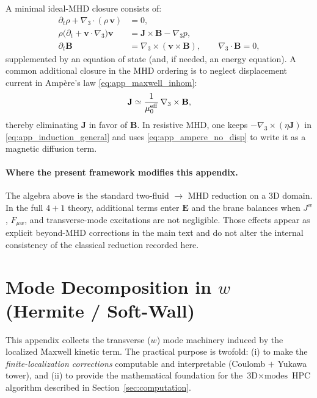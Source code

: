 \documentclass[11pt]{article}
\newcommand{\gradthree}{\nabla_3}
\begin{document}
A minimal ideal-MHD closure consists of:
\begin{align}
\partial_t\rho + \gradthree\cdot(\rho\,\mathbf{v}) &= 0,
\label{eq:app_mhd_cont}
\\
\rho\Big(\partial_t + \mathbf{v}\cdot\gradthree\Big)\mathbf{v}
&= \mathbf{J}\times\mathbf{B} - \gradthree p,
\label{eq:app_mhd_mom}
\\
\partial_t\mathbf{B} &= \gradthree\times(\mathbf{v}\times\mathbf{B}),
\qquad
\gradthree\cdot\mathbf{B}=0,
\label{eq:app_mhd_induction}
\end{align}
supplemented by an equation of state (and, if needed, an energy equation). A common
additional closure in the MHD ordering is to neglect displacement current in Amp\`ere's
law \eqref{eq:app_maxwell_inhom}:
\begin{equation}
\mathbf{J} \simeq \frac{1}{\mu_0^{\rm eff}}\,\gradthree\times\mathbf{B},
\label{eq:app_ampere_no_disp}
\end{equation}
thereby eliminating \(\mathbf{J}\) in favor of \(\mathbf{B}\). In resistive MHD, one
keeps \(-\gradthree\times(\eta\mathbf{J})\) in \eqref{eq:app_induction_general} and uses
\eqref{eq:app_ampere_no_disp} to write it as a magnetic diffusion term.

\paragraph{Where the present framework modifies this appendix.}
The algebra above is the standard two-fluid \(\to\) MHD reduction on a \(3\)D domain.
In the full \(4+1\) theory, additional terms enter \(\mathbf{E}\) and the brane balances
when \(J^w\), \(F_{\mu w}\), and transverse-mode excitations are not negligible. Those
effects appear as explicit beyond-MHD corrections in the main text and do not alter the
internal consistency of the classical reduction recorded here.

\section{Mode Decomposition in \texorpdfstring{$w$}{w} (Hermite / Soft-Wall)}
\label{sec:kk_modes}

This appendix collects the transverse (\(w\)) mode machinery induced by the localized
Maxwell kinetic term. The practical purpose is twofold:
(i) to make the \emph{finite-localization corrections} computable and interpretable
(Coulomb \(+\) Yukawa tower), and
(ii) to provide the mathematical foundation for the \(\text{3D}\times\text{modes}\)
HPC algorithm described in Section~\ref{sec:computation}.
\end{document}
